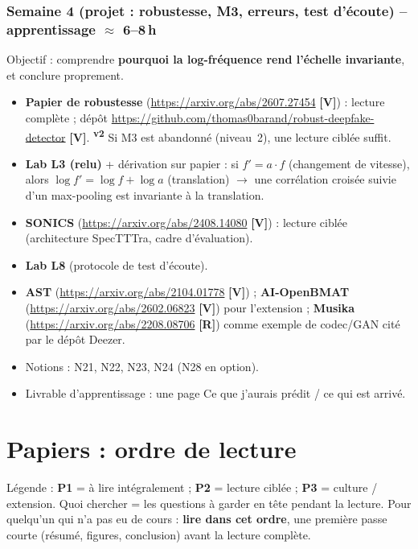 \documentclass[11pt,a4paper]{article}
\providecommand{\og}{\guillemotleft\nobreakspace}%
\providecommand{\fg}{\nobreakspace\guillemotright}}
\newcommand{\sS}{\ding{72}}   %
\newcommand{\sO}{\ding{73}}   %
\newcommand{\vtwo}{\textsuperscript{\textcolor{orange!80!black}{\textbf{v2}}}}
\newcommand{\lV}{\textbf{\textcolor{green!45!black}{[V]}}}
\newcommand{\lR}{\textbf{\textcolor{orange!80!black}{[R]}}}
\begin{document}
\subsubsection{Semaine 4 (projet : robustesse, M3, erreurs, test d'écoute) -- apprentissage $\approx$ 6--8\,h}
Objectif : comprendre \textbf{pourquoi la log-fréquence rend l'échelle invariante}, et conclure proprement.
\begin{itemize}
\item \textbf{\sS} \textbf{Papier de robustesse} (\url{https://arxiv.org/abs/2607.27454} \lV) : lecture complète ; dépôt \url{https://github.com/thomas0barand/robust-deepfake-detector} \lV. \vtwo{} Si M3 est abandonné (niveau~2), une lecture ciblée suffit.
\item \textbf{\sS} \textbf{Lab L3 (relu)} + dérivation sur papier : si $f' = a\cdot f$ (changement de vitesse), alors $\log f' = \log f + \log a$ (translation) $\rightarrow$ une corrélation croisée suivie d'un max-pooling est invariante à la translation.
\item \textbf{\sS} \textbf{SONICS} (\url{https://arxiv.org/abs/2408.14080} \lV) : lecture ciblée (architecture SpecTTTra, cadre d'évaluation).
\item \textbf{\sS} \textbf{Lab L8} (protocole de test d'écoute).
\item \textbf{\sO} \textbf{AST} (\url{https://arxiv.org/abs/2104.01778} \lV) ; \textbf{AI-OpenBMAT} (\url{https://arxiv.org/abs/2602.06823} \lV) pour l'extension ; \textbf{Musika} (\url{https://arxiv.org/abs/2208.08706} \lR) comme exemple de codec/GAN cité par le dépôt Deezer.
\item Notions : N21, N22, N23, N24 (N28 en option).
\item Livrable d'apprentissage : une page \og{}Ce que j'aurais prédit / ce qui est arrivé\fg{}.
\end{itemize}
\section{Papiers : ordre de lecture}\label{sec:papiers}

Légende : \textbf{P1} = à lire intégralement ; \textbf{P2} = lecture ciblée ; \textbf{P3} = culture / extension. \og{}Quoi chercher\fg{} = les questions à garder en tête pendant la lecture. Pour quelqu'un qui n'a pas eu de cours : \textbf{lire dans cet ordre}, une première passe courte (résumé, figures, conclusion) avant la lecture complète.
\end{document}
